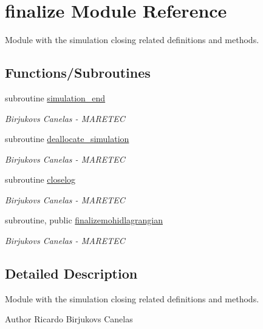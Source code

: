 \hypertarget{namespacefinalize}{}\section{finalize Module Reference}
\label{namespacefinalize}


Module with the simulation closing related definitions and methods.  


\subsection*{Functions/\+Subroutines}
\begin{DoxyCompactItemize}
\item 
subroutine \mbox{\hyperlink{namespacefinalize_a57fbc96712f416103b529ff969479250}{simulation\+\_\+end}}
\begin{DoxyCompactList}\small\item\em Birjukovs Canelas -\/ M\+A\+R\+E\+T\+EC \end{DoxyCompactList}\item 
subroutine \mbox{\hyperlink{namespacefinalize_a2b6733e6db5a768ac96ad9274685ad43}{deallocate\+\_\+simulation}}
\begin{DoxyCompactList}\small\item\em Birjukovs Canelas -\/ M\+A\+R\+E\+T\+EC \end{DoxyCompactList}\item 
subroutine \mbox{\hyperlink{namespacefinalize_ac448631d05fe5daa8739f32c95e89152}{closelog}}
\begin{DoxyCompactList}\small\item\em Birjukovs Canelas -\/ M\+A\+R\+E\+T\+EC \end{DoxyCompactList}\item 
subroutine, public \mbox{\hyperlink{namespacefinalize_a57aceaa0eb3b16c1942dd2cb013010e4}{finalizemohidlagrangian}}
\begin{DoxyCompactList}\small\item\em Birjukovs Canelas -\/ M\+A\+R\+E\+T\+EC \end{DoxyCompactList}\end{DoxyCompactItemize}


\subsection{Detailed Description}
Module with the simulation closing related definitions and methods. 

\begin{DoxyAuthor}{Author}
Ricardo Birjukovs Canelas 
\end{DoxyAuthor}


